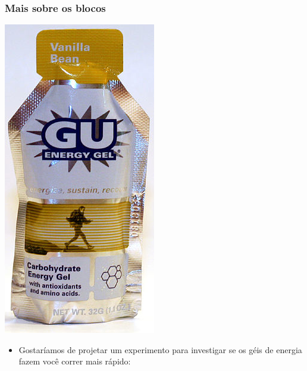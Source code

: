 \begin{frame}
\frametitle{Mais sobre os blocos}


{
\begin{center}
\includegraphics[width=\textwidth]{1-5_experiments/gu.png}
\end{center}
}
{
\begin{itemize}
\justifying
\item Gostaríamos de projetar um experimento para investigar se os géis de energia fazem você correr mais rápido:


\end{itemize}}
\end{frame}

